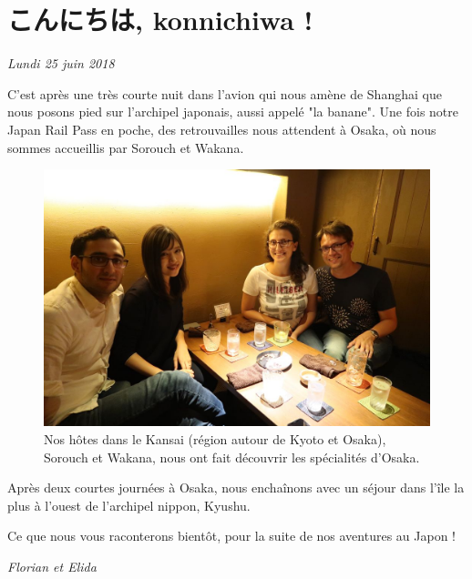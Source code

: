 \hypertarget{ux3053ux3093ux306bux3061ux306f-konnichiwa}{%
\section{こんにちは, konnichiwa
!}\label{ux3053ux3093ux306bux3061ux306f-konnichiwa}}

\emph{Lundi 25 juin 2018}

C'est après une très courte nuit dans l'avion qui nous amène de Shanghai
que nous posons pied sur l'archipel japonais, aussi appelé "la banane".
Une fois notre Japan Rail Pass en poche, des retrouvailles nous
attendent à Osaka, où nous sommes accueillis par Sorouch et Wakana.

\begin{figure}
\centering
\includegraphics{images/20180625_osaka.JPG}
\caption{Nos hôtes dans le Kansai (région autour de Kyoto et Osaka),
Sorouch et Wakana, nous ont fait découvrir les spécialités d'Osaka.}
\end{figure}

Après deux courtes journées à Osaka, nous enchaînons avec un séjour dans
l'île la plus à l'ouest de l'archipel nippon, Kyushu.

Ce que nous vous raconterons bientôt, pour la suite de nos aventures au
Japon !

\emph{Florian et Elida}

